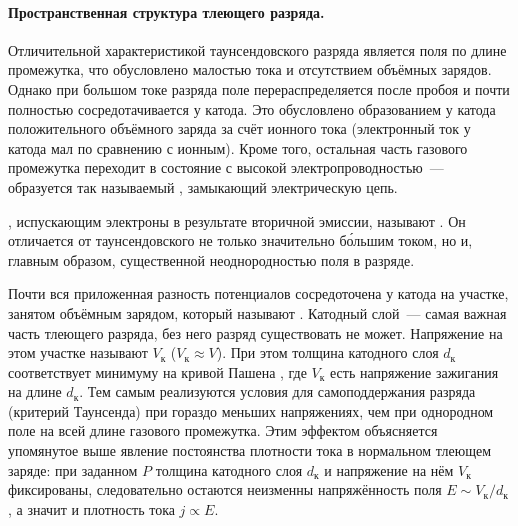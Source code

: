 \paragraph{Пространственная структура тлеющего разряда.}
Отличительной характеристикой таунсендовского разряда
является  поля по длине промежутка, что обусловлено малостью тока
и отсутствием объёмных зарядов. Однако при большом токе разряда поле
перераспределяется после пробоя и почти полностью сосредотачивается у катода.
Это обусловлено образованием у катода положительного объёмного заряда за счёт
ионного тока (электронный ток у катода мал по сравнению с ионным). Кроме того,
остальная часть газового промежутка переходит в состояние с высокой
электропроводностью~--- образуется так называемый
, замыкающий электрическую цепь.

, испускающим электроны
в результате вторичной эмиссии, называют .
Он отличается от таунсендовского не только значительно б\'{о}льшим током,
но и, главным образом, существенной неоднородностью поля в разряде.

Почти вся приложенная разность потенциалов сосредоточена у катода на участке,
занятом объёмным зарядом, который называют .
Катодный слой~--- самая важная часть тлеющего разряда,
без него разряд существовать не может.
Напряжение на этом участке называют
 $V_{к}$ ($V_{к} \approx V$).
При этом толщина катодного слоя $d_{к}$ соответствует минимуму на кривой
Пашена , где $V_{к}$ есть напряжение зажигания
на длине $d_{к}$. Тем самым реализуются условия для самоподдержания разряда
(критерий Таунсенда) при гораздо меньших напряжениях, чем при однородном поле
на всей длине газового промежутка.
Этим эффектом объясняется упомянутое выше явление постоянства плотности
тока в нормальном тлеющем заряде: при заданном $P$ толщина катодного
слоя $d_{к}$ и напряжение на нём $V_{к}$ фиксированы, следовательно
остаются неизменны напряжённость поля $E\sim V_{к}/d_{к}$, а значит
и плотность тока $j\propto E$.




